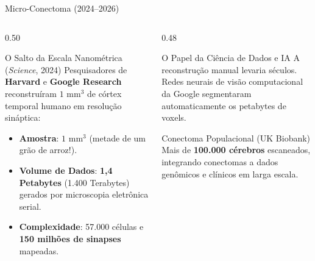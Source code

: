 \documentclass[aspectratio=169, 10pt]{beamer}
\begin{document}
\begin{frame}{Micro-Conectoma (2024--2026)}
  \begin{columns}
    \begin{column}{0.50\textwidth}
      \begin{block}{O Salto da Escala Nanométrica (\textit{Science}, 2024)}
        Pesquisadores de \textbf{Harvard} e \textbf{Google Research} reconstruíram $1\text{ mm}^3$ de córtex temporal humano em resolução sináptica:
        \begin{itemize}
          \item \textbf{Amostra}: $1\text{ mm}^3$ (metade de um grão de arroz!).
          \item \textbf{Volume de Dados}: \textbf{1,4 Petabytes} (1.400 Terabytes) gerados por microscopia eletrônica serial.
          \item \textbf{Complexidade}: 57.000 células e \textbf{150 milhões de sinapses} mapeadas.
        \end{itemize}
      \end{block}
    \end{column}
    \begin{column}{0.48\textwidth}
      \begin{alertblock}{O Papel da Ciência de Dados e IA}
        A reconstrução manual levaria séculos. Redes neurais de visão computacional da Google segmentaram automaticamente os petabytes de voxels.
      \end{alertblock}
      \begin{exampleblock}{Conectoma Populacional (UK Biobank)}
        Mais de \textbf{100.000 cérebros} escaneados, integrando conectomas a dados genômicos e clínicos em larga escala.
      \end{exampleblock}
    \end{column}
  \end{columns}
\end{frame}
\end{document}
